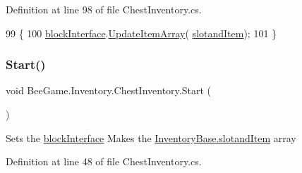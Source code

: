 Definition at line 98 of file Chest\+Inventory.\+cs.


\begin{DoxyCode}
99         \{
100             \hyperlink{class_bee_game_1_1_inventory_1_1_chest_inventory_aa18498b9af704585d4c747ff5a7444f8}{blockInterface}.\hyperlink{class_bee_game_1_1_blocks_1_1_block_game_object_interface_acecdd76ab9fd7639409fe29ebd29d4fd}{UpdateItemArray}(
      \hyperlink{class_bee_game_1_1_inventory_1_1_inventory_base_a405502a6eabf14e1498d96dc8aff5e8d}{slotandItem});
101         \}
\end{DoxyCode}
\mbox{\label{class_bee_game_1_1_inventory_1_1_chest_inventory_a3476b739dab6ac46a8152da085d8399a}} 
\subsubsection{\texorpdfstring{Start()}{Start()}}
{\footnotesize\ttfamily void Bee\+Game.\+Inventory.\+Chest\+Inventory.\+Start (\begin{DoxyParamCaption}{ }\end{DoxyParamCaption})\hspace{0.3cm}{\ttfamily [private]}}



Sets the \hyperlink{class_bee_game_1_1_inventory_1_1_chest_inventory_aa18498b9af704585d4c747ff5a7444f8}{block\+Interface} Makes the \hyperlink{class_bee_game_1_1_inventory_1_1_inventory_base_a405502a6eabf14e1498d96dc8aff5e8d}{Inventory\+Base.\+slotand\+Item} array 



Definition at line 48 of file Chest\+Inventory.\+cs.


